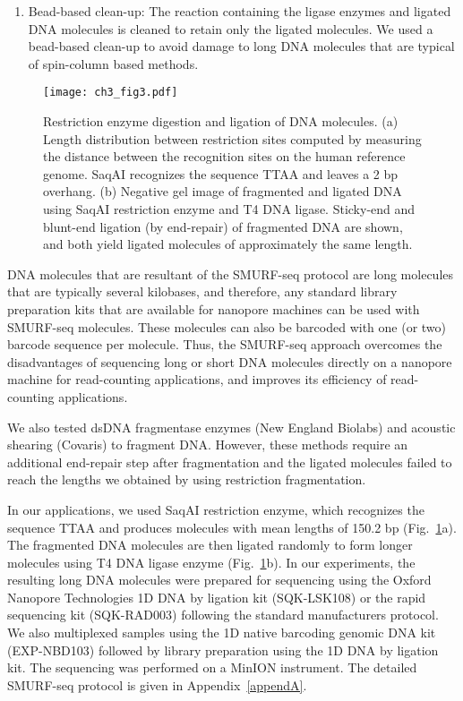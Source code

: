 \begin{enumerate}
\item Bead-based clean-up: The reaction containing the ligase enzymes and
  ligated DNA molecules is cleaned to retain only the ligated molecules. We
  used a bead-based clean-up to avoid damage to long DNA
  molecules that are typical of spin-column based methods.
\end{enumerate}

\begin{figure}[b!]
\centering
\texttt{[image: ch3\_fig3.pdf]}
\caption[Restriction enzyme digestion and ligation of DNA molecules.]{
  Restriction enzyme digestion and ligation of DNA molecules.
  (a) Length distribution between restriction sites computed
  by measuring the distance between the recognition sites on the human
  reference genome. SaqAI recognizes the sequence TTAA and leaves a 2 bp
  overhang.
  (b) Negative gel image of fragmented and ligated DNA
  using SaqAI restriction enzyme and T4 DNA ligase.  Sticky-end and
  blunt-end ligation (by end-repair) of fragmented DNA are shown, and
  both yield ligated molecules of approximately the same length.}
\label{re_frag}
\end{figure}

DNA molecules that are resultant of the SMURF-seq protocol are long
molecules that are typically several kilobases, and therefore, any
standard library preparation kits that are available for nanopore
machines can be used with SMURF-seq molecules. These molecules can also
be barcoded with one (or two) barcode sequence per molecule. Thus, the
SMURF-seq approach overcomes the disadvantages of sequencing long or
short DNA molecules directly on a nanopore machine for read-counting
applications, and improves its efficiency of read-counting applications.

We also tested dsDNA fragmentase enzymes (New England Biolabs) and
acoustic shearing (Covaris) to fragment DNA. However, these methods
require an additional end-repair step after fragmentation and the
ligated molecules failed to reach the lengths we obtained by using
restriction fragmentation.

In our applications, we used SaqAI restriction enzyme, which recognizes
the sequence TTAA and produces molecules with mean lengths of 150.2 bp
(Fig.~\ref{re_frag}a).
The fragmented DNA molecules are then ligated randomly to form longer
molecules using T4 DNA ligase enzyme (Fig.~\ref{re_frag}b).
%
In our experiments, the resulting long DNA molecules were prepared for
sequencing using the Oxford Nanopore Technologies 1D DNA by ligation kit
(SQK-LSK108) or the rapid sequencing kit (SQK-RAD003) following the
standard manufacturers protocol. We also multiplexed samples using the
1D native barcoding genomic DNA kit (EXP-NBD103) followed by library
preparation using the 1D DNA by ligation kit. The sequencing was
performed on a MinION instrument.
%
The detailed SMURF-seq protocol is given in Appendix~\ref{appendA}.


